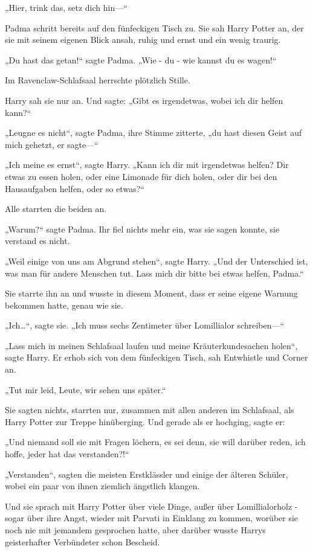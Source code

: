 {„Hier, trink das, setz dich hin—“

Padma schritt bereits auf den fünfeckigen Tisch zu. Sie sah Harry Potter an, der sie mit seinem eigenen Blick ansah, ruhig und ernst und ein wenig traurig.

„Du hast das getan!“ sagte Padma. „Wie - du - wie kannst du es wagen!“

Im Ravenclaw-Schlafsaal herrschte plötzlich Stille.

Harry sah sie nur an. Und sagte: „Gibt es irgendetwas, wobei ich dir helfen kann?“

„Leugne es nicht“, sagte Padma, ihre Stimme zitterte, „du hast diesen Geist auf mich gehetzt, er sagte—“

„Ich meine es ernst“, sagte Harry. „Kann ich dir mit irgendetwas helfen? Dir etwas zu essen holen, oder eine Limonade für dich holen, oder dir bei den Hausaufgaben helfen, oder so etwas?“

Alle starrten die beiden an.

„Warum?“ sagte Padma. Ihr fiel nichts mehr ein, was sie sagen konnte, sie verstand es nicht.

„Weil einige von uns am Abgrund stehen“, sagte Harry. „Und der Unterschied ist, was man für andere Menschen tut. Lass mich dir bitte bei etwas helfen, Padma.“

Sie starrte ihn an und wusste in diesem Moment, dass er seine eigene Warnung bekommen hatte, genau wie sie.

„Ich…“, sagte sie. „Ich muss sechs Zentimeter über Lomillialor schreiben—“

„Lass mich in meinen Schlafsaal laufen und meine Kräuterkundesachen holen“, sagte Harry. Er erhob sich von dem fünfeckigen Tisch, sah Entwhistle und Corner an.

„Tut mir leid, Leute, wir sehen uns später.“

Sie sagten nichts, starrten nur, zusammen mit allen anderen im Schlafsaal, als Harry Potter zur Treppe hinüberging. Und gerade als er hochging, sagte er:

„Und niemand soll sie mit Fragen löchern, es sei denn, sie will darüber reden, ich hoffe, jeder hat das verstanden?!“

„Verstanden“, sagten die meisten Erstklässler und einige der älteren Schüler, wobei ein paar von ihnen ziemlich ängstlich klangen.

Und sie sprach mit Harry Potter über viele Dinge, außer über Lomillialorholz - sogar über ihre Angst, wieder mit Parvati in Einklang zu kommen, worüber sie noch nie mit jemandem gesprochen hatte, aber darüber wusste Harrys geisterhafter Verbündeter schon Bescheid.

}
